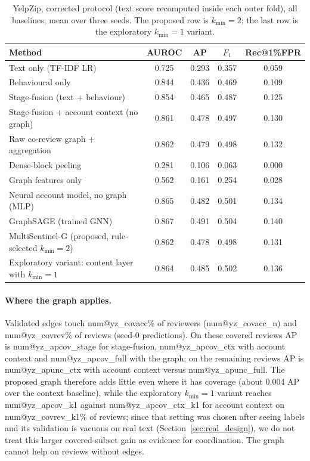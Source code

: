 \documentclass[pdflatex,sn-basic]{sn-jnl}
\makeatletter
\theoremstyle{thmstyleone}
\theoremstyle{thmstylethree}
\newcommand{\num}[1]{\csname num@#1\endcsname}
\makeatother
\begin{document}
\begin{table}[t]
\caption{YelpZip, corrected protocol (text score recomputed inside each outer fold), all baselines; mean over three seeds. The proposed row is $k_{\min}=2$; the last row is the exploratory $k_{\min}=1$ variant.}\label{tab:yelp_old}
\small\setlength{\tabcolsep}{3pt}
\begin{tabular}{@{}lcccc@{}}
\toprule
Method & AUROC & AP & $F_1$ & Rec@1\%FPR \\
\midrule
Text only (TF-IDF LR) & 0.725 & 0.293 & 0.357 & 0.059 \\
Behavioural only & 0.844 & 0.436 & 0.469 & 0.109 \\
Stage-fusion (text + behaviour) & 0.854 & 0.465 & 0.487 & 0.125 \\
Stage-fusion + account context (no graph) & 0.861 & 0.478 & 0.497 & 0.130 \\
Raw co-review graph + aggregation & 0.862 & 0.479 & 0.498 & 0.132 \\
Dense-block peeling & 0.281 & 0.106 & 0.063 & 0.000 \\
Graph features only & 0.562 & 0.161 & 0.254 & 0.028 \\
Neural account model, no graph (MLP) & 0.865 & 0.482 & 0.501 & 0.134 \\
GraphSAGE (trained GNN) & 0.867 & 0.491 & 0.504 & 0.140 \\
MultiSentinel-G (proposed, rule-selected $k_{\min}=2$) & 0.862 & 0.478 & 0.498 & 0.131 \\
Exploratory variant: content layer with $k_{\min}=1$ & 0.864 & 0.485 & 0.502 & 0.136 \\
\bottomrule
\end{tabular}
\end{table}

\paragraph{Where the graph applies.} Validated edges touch \num{yz_covacc}\% of reviewers (\num{yz_covacc_n}) and \num{yz_covrev}\% of reviews (seed-0 predictions). On these covered reviews AP is \num{yz_apcov_stage} for stage-fusion, \num{yz_apcov_ctx} with account context and \num{yz_apcov_full} with the graph; on the remaining reviews AP is \num{yz_apunc_ctx} with account context versus \num{yz_apunc_full}. The proposed graph therefore adds little even where it has coverage (about 0.004 AP over the context baseline), while the exploratory $k_{\min}=1$ variant reaches \num{yz_apcov_k1} against \num{yz_apcov_ctx_k1} for account context on \num{yz_covrev_k1}\% of reviews; since that setting was chosen after seeing labels and its validation is vacuous on real text (Section~\ref{sec:real_design}), we do not treat this larger covered-subset gain as evidence for coordination. The graph cannot help on reviews without edges.
\end{document}
